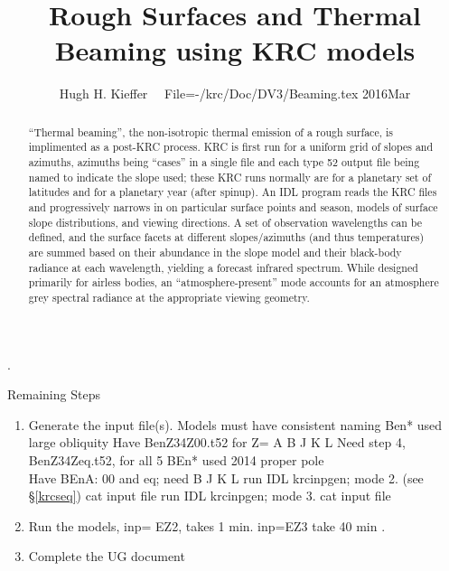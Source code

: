 \documentclass{article}
\title{Rough Surfaces and Thermal Beaming using KRC models}
\author{Hugh H. Kieffer  \ \ File=-/krc/Doc/DV3/Beaming.tex  2016Mar}
\begin{document}
\maketitle
\tableofcontents
\listoffigures
\hrulefill .\hrulefill

\begin{abstract}
``Thermal beaming'', the non-isotropic thermal emission of a rough surface, is
  implimented as a post-KRC process.  KRC is first run for a uniform grid of
  slopes and azimuths, azimuths being ``cases'' in a single file and each type
  52 output file being named to indicate the slope used; these KRC runs normally
  are for a planetary set of latitudes and for a planetary year (after
  spinup). An IDL program reads the KRC files and progressively narrows in on
  particular surface points and season, models of surface slope distributions,
  and viewing directions. A set of observation wavelengths can be defined, and
  the surface facets at different slopes/azimuths (and thus temperatures) are
  summed based on their abundance in the slope model and their black-body
  radiance at each wavelength, yielding a forecast infrared spectrum. While
  designed primarily for airless bodies, an ``atmosphere-present'' mode accounts
  for an atmosphere grey spectral radiance at the appropriate viewing geometry.
\end{abstract}

Remaining Steps \begin{enumerate}    %
 \item Generate the input file(s). Models must have consistent naming
\qi Ben* used large obliquity
\qii Have BenZ34Z00.t52 for  Z= A B J K L
\qii Need step 4, BenZ34Zeq.t52, for all 5
\qi BEn* used 2014 proper pole
\\ Have BEnA: 00 and eq; need B J K L
\qi run IDL krcinpgen;  mode 2. (see \S \ref{krcseq}) cat input file
\qi run IDL krcinpgen;  mode 3.  cat input file
 \item Run the models, inp= EZ2, takes 1 min.  inp=EZ3 take 40 min .
 \item Complete the UG document
\end{enumerate}
\end{document}
